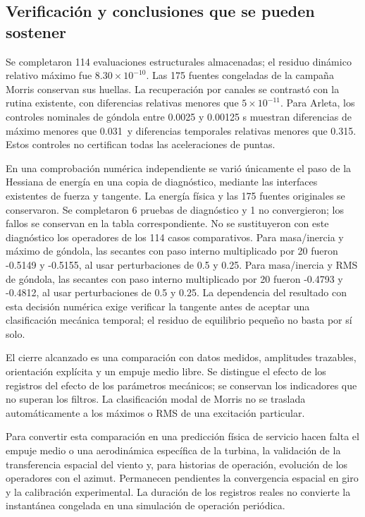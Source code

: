 \documentclass[11pt,a4paper]{article}
\newcommand{\pct}{\text{\char37}}
\begin{document}
\subsection{Verificación y conclusiones que se pueden sostener}
Se completaron 114 evaluaciones estructurales almacenadas; el residuo dinámico relativo máximo fue $8.30\times10^{-10}$. Las 175 fuentes congeladas de la campaña Morris conservan sus huellas. La recuperación por canales se contrastó con la rutina existente, con diferencias relativas menores que $5\times10^{-11}$. Para Arleta, los controles nominales de góndola entre 0.0025 y 0.00125 s muestran diferencias de máximo menores que 0.031\pct\ y diferencias temporales relativas menores que 0.315\pct. Estos controles no certifican todas las aceleraciones de puntas.

En una comprobación numérica independiente se varió únicamente el paso de la Hessiana de energía en una copia de diagnóstico, mediante las interfaces existentes de fuerza y tangente. La energía física y las 175 fuentes originales se conservaron. Se completaron 6 pruebas de diagnóstico y 1 no convergieron; los fallos se conservan en la tabla correspondiente. No se sustituyeron con este diagnóstico los operadores de los 114 casos comparativos. Para masa/inercia y máximo de góndola, las secantes con paso interno multiplicado por 20 fueron -0.5149 y -0.5155, al usar perturbaciones de 0.5 y 0.25\pct. Para masa/inercia y RMS de góndola, las secantes con paso interno multiplicado por 20 fueron -0.4793 y -0.4812, al usar perturbaciones de 0.5 y 0.25\pct. La dependencia del resultado con esta decisión numérica exige verificar la tangente antes de aceptar una clasificación mecánica temporal; el residuo de equilibrio pequeño no basta por sí solo.

El cierre alcanzado es una comparación con datos medidos, amplitudes trazables, orientación explícita y un empuje medio libre. Se distingue el efecto de los registros del efecto de los parámetros mecánicos; se conservan los indicadores que no superan los filtros. La clasificación modal de Morris no se traslada automáticamente a los máximos o RMS de una excitación particular.

Para convertir esta comparación en una predicción física de servicio hacen falta el empuje medio o una aerodinámica específica de la turbina, la validación de la transferencia espacial del viento y, para historias de operación, evolución de los operadores con el azimut. Permanecen pendientes la convergencia espacial en giro y la calibración experimental. La duración de los registros reales no convierte la instantánea congelada en una simulación de operación periódica.
\end{document}
